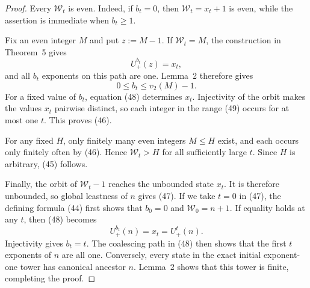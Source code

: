 \documentclass[11pt]{article}
\newcommand{\Up}{U_+}
\begin{document}
\begin{proof}
Every $\mathcal W_t$ is even.  Indeed, if $b_t=0$, then
$\mathcal W_t=x_t+1$ is even, while the assertion is immediate when
$b_t\geq1$.

Fix an even integer $M$ and put $z:=M-1$.  If $\mathcal W_t=M$, the
construction in Theorem~5 gives
\[
  \Up^{b_t}(z)=x_t,
  \tag{48}
\]
and all $b_t$ exponents on this path are one.  Lemma~2 therefore gives
\[
  0\leq b_t\leq v_2(M)-1.
  \tag{49}
\]
For a fixed value of $b_t$, equation (48) determines $x_t$.  Injectivity of
the orbit makes the values $x_t$ pairwise distinct, so each integer in the
range (49) occurs for at most one $t$.  This proves (46).

For any fixed $H$, only finitely many even integers $M\leq H$ exist, and
each occurs only finitely often by (46).  Hence $\mathcal W_t>H$ for all
sufficiently large $t$.  Since $H$ is arbitrary, (45) follows.

Finally, the orbit of $\mathcal W_t-1$ reaches the unbounded state $x_t$.
It is therefore unbounded, so global leastness of $n$ gives (47).  If
we take $t=0$ in (47), the defining formula (44) first shows that
$b_0=0$ and $\mathcal W_0=n+1$.  If equality holds at any $t$, then (48)
becomes
\[
  \Up^{b_t}(n)=x_t=\Up^t(n).
\]
Injectivity gives $b_t=t$.  The coalescing path in (48) then shows that the
first $t$ exponents of $n$ are all one.  Conversely, every state in the
exact initial exponent-one tower has canonical ancestor $n$.  Lemma~2
shows that this tower is finite, completing the proof.
\end{proof}
\end{document}

